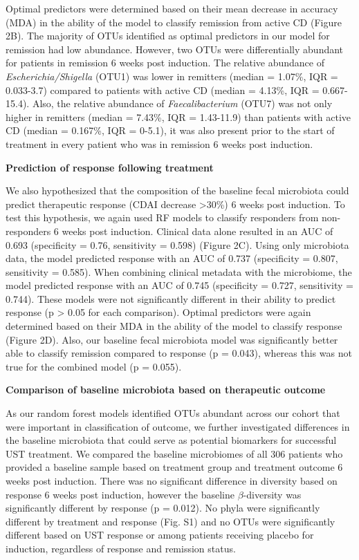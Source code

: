 \documentclass[12pt,]{article}
\begin{document}
Optimal predictors were determined based on their mean decrease in
accuracy (MDA) in the ability of the model to classify remission from
active CD (Figure 2B). The majority of OTUs identified as optimal
predictors in our model for remission had low abundance. However, two
OTUs were differentially abundant for patients in remission 6 weeks post
induction. The relative abundance of \emph{Escherichia/Shigella} (OTU1)
was lower in remitters (median = 1.07\%, IQR = 0.033-3.7) compared to
patients with active CD (median = 4.13\%, IQR = 0.667-15.4). Also, the
relative abundance of \emph{Faecalibacterium} (OTU7) was not only higher
in remitters (median = 7.43\%, IQR = 1.43-11.9) than patients with
active CD (median = 0.167\%, IQR = 0-5.1), it was also present prior to
the start of treatment in every patient who was in remission 6 weeks
post induction.

\textbf{Prediction of response following treatment}

We also hypothesized that the composition of the baseline fecal
microbiota could predict therapeutic response (CDAI decrease
\textgreater{}30\%) 6 weeks post induction. To test this hypothesis, we
again used RF models to classify responders from non-responders 6 weeks
post induction. Clinical data alone resulted in an AUC of 0.693
(specificity = 0.76, sensitivity = 0.598) (Figure 2C). Using only
microbiota data, the model predicted response with an AUC of 0.737
(specificity = 0.807, sensitivity = 0.585). When combining clinical
metadata with the microbiome, the model predicted response with an AUC
of 0.745 (specificity = 0.727, sensitivity = 0.744). These models were
not significantly different in their ability to predict response (p
\textgreater{} 0.05 for each comparison). Optimal predictors were again
determined based on their MDA in the ability of the model to classify
response (Figure 2D). Also, our baseline fecal microbiota model was
significantly better able to classify remission compared to response (p
= 0.043), whereas this was not true for the combined model (p = 0.055).

\textbf{Comparison of baseline microbiota based on therapeutic outcome}

As our random forest models identified OTUs abundant across our cohort
that were important in classification of outcome, we further
investigated differences in the baseline microbiota that could serve as
potential biomarkers for successful UST treatment. We compared the
baseline microbiomes of all 306 patients who provided a baseline sample
based on treatment group and treatment outcome 6 weeks post induction.
There was no significant difference in diversity based on response 6
weeks post induction, however the baseline \({\beta}\)-diversity was
significantly different by response (p = 0.012). No phyla were
significantly different by treatment and response (Fig. S1) and no OTUs
were significantly different based on UST response or among patients
receiving placebo for induction, regardless of response and remission
status.
\end{document}

